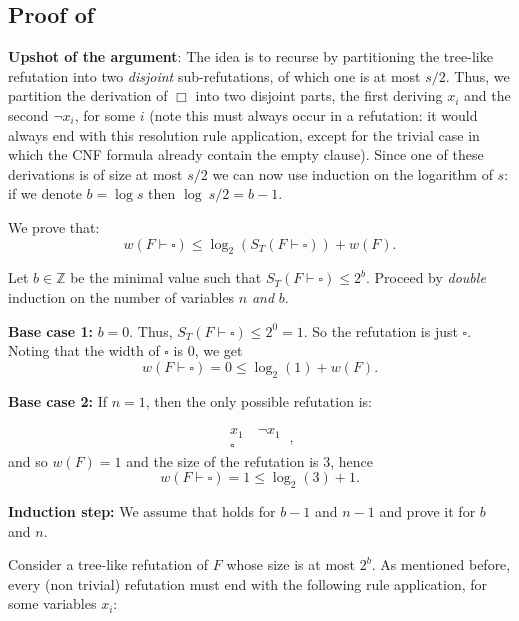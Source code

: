 \subsection{Proof of }



\noindent \textbf{Upshot of the argument}:
The idea is to  recurse by partitioning the tree-like refutation into two \emph{disjoint} sub-refutations, of which one is at most $s/2$. Thus, we partition the derivation of $\Box$ into two disjoint parts, the first deriving $x_i$ and the second $\neg x_i$, for some $i$ (note this must always occur in a refutation: it would always end with this resolution rule application, except for the trivial case in which  the CNF formula already contain the empty clause). Since one of these derivations is of size at most $s/2$ we can now use induction on the logarithm of $s$: if we denote $b=\log s$ then $\log\ s/2 =b-1$. 
\bigskip 


We prove that:
\begin{equation}
\label{eq:gluing-lemma-1-to-prove}
w(F \vdash \square) \leq \log_2(S_T(F \vdash \square)) + w(F).
\end{equation}

Let $b \in \mathbb{Z}$ be the minimal value such that $S_T(F \vdash \square) \leq 2^b$.  
Proceed by \emph{double} induction on the number of variables $n$ \emph{and} $b$.

\textbf{Base case 1:}  
 $b = 0$. Thus, $S_T(F \vdash \square) \leq 2^0 = 1$. So the refutation is just $\square$.  
Noting that the width of $\square$ is 0, we get    
\[
w(F \vdash \square) = 0 \leq \log_2(1) + w(F).
\]

\textbf{Base case 2:} If $n = 1$, then the only possible refutation is:

\[
\begin{array}{c}
    x_1 \quad \neg x_1 \\
    \hline 
    \square
\end{array}~,
\]
and so $w(F) = 1$ and the size of the refutation is 3, hence  
\[
w(F \vdash \square) = 1  \leq \log_2(3) + 1.
\]

\textbf{Induction step:}  
We assume that   holds for $b-1$ and $n-1$ and prove it for $b$ and $n$.

Consider a tree-like refutation of $F$ whose size is at most $2^b$. As mentioned before, every (non trivial) refutation must end with the following rule application, for some variables $x_i$:

